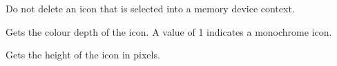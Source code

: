 Do not delete an icon that is selected into a memory device context.

\begin{comment}
\membersection{wxIcon::Create}\label{wxiconcreate}

\func{virtual bool}{Create}{\param{int}{ width}, \param{int}{ height}, \param{int}{ depth = -1}}

Creates a fresh icon. If the final argument is omitted, the display depth of
the screen is used.

\func{virtual bool}{Create}{\param{void*}{ data}, \param{int}{ type}, \param{int}{ width}, \param{int}{ height}, \param{int}{ depth = -1}}

Creates an icon from the given data, which can be of arbitrary type.

\wxheading{Parameters}

\docparam{width}{The width of the icon in pixels.}

\docparam{height}{The height of the icon in pixels.}

\docparam{depth}{The depth of the icon in pixels. If this is -1, the screen depth is used.}

\docparam{data}{Data whose type depends on the value of {\it type}.}

\docparam{type}{An icon type identifier - see \helpref{wxIcon::wxIcon}{wxiconconstr} for a list
of possible values.}

\wxheading{Return value}

TRUE if the call succeeded, FALSE otherwise.

\wxheading{Remarks}

The first form works on all platforms. The portability of the second form depends on the
type of data.

\wxheading{See also}

\helpref{wxIcon::wxIcon}{wxiconconstr}

\end{comment}



Gets the colour depth of the icon. A value of 1 indicates a
monochrome icon.

\label{wxicongetheight}


Gets the height of the icon in pixels.

\label{wxicongetwidth}

